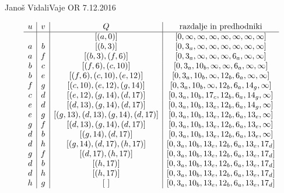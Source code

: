 \begin{naloga}{Janoš Vidali}{Vaje OR 7.12.2016}
\begin{odgovor}
\begin{tabela}
$$
\begin{array}{c|c|c|c}
u & v & Q & \text{razdalje in predhodniki} \\ \hline
  &   & [(a,0)]  & [0, \infty, \infty, \infty, \infty, \infty, \infty, \infty] \\
a & b & [(b, 3)]  & [0, 3_a, \infty, \infty, \infty, \infty, \infty, \infty] \\
a & f & [(b, 3), (f, 6)]  & [0, 3_a, \infty, \infty, \infty, 6_a, \infty, \infty] \\
b & c & [(f, 6), (c, 10)]  & [0, 3_a, 10_b, \infty, \infty, 6_a, \infty, \infty] \\
b & e & [(f, 6), (c, 10), (e, 12)]  & [0, 3_a, 10_b, \infty, 12_b, 6_a, \infty, \infty] \\
f & g & [(c, 10), (e, 12), (g, 14)]  & [0, 3_a, 10_b, \infty, 12_b, 6_a, 14_g, \infty] \\
c & d & [(e, 12), (g, 14), (d, 17)]  & [0, 3_a, 10_b, 17_c, 12_b, 6_a, 14_g, \infty] \\
e & d & [(d, 13), (g, 14), (d, 17)]  & [0, 3_a, 10_b, 13_e, 12_b, 6_a, 14_g, \infty] \\
e & g & [(g, 13), (d, 13), (g, 14), (d, 17)]  & [0, 3_a, 10_b, 13_e, 12_b, 6_a, 13_e, \infty] \\
g & f & [(d, 13), (g, 14), (d, 17)]  & [0, 3_a, 10_b, 13_e, 12_b, 6_a, 13_e, \infty] \\
d & b & [(g, 14), (d, 17)]  & [0, 3_a, 10_b, 13_e, 12_b, 6_a, 13_e, \infty] \\
d & h & [(g, 14), (d, 17), (h, 17)]  & [0, 3_a, 10_b, 13_e, 12_b, 6_a, 13_e, 17_d] \\
g & f & [(d, 17), (h, 17)]  & [0, 3_a, 10_b, 13_e, 12_b, 6_a, 13_e, 17_d] \\
d & b & [(h, 17)]  & [0, 3_a, 10_b, 13_e, 12_b, 6_a, 13_e, 17_d] \\
d & h & [(h, 17)]  & [0, 3_a, 10_b, 13_e, 12_b, 6_a, 13_e, 17_d] \\
h & g & [\ ]  & [0, 3_a, 10_b, 13_e, 12_b, 6_a, 13_e, 17_d]
\end{array}
$$
\end{tabela}

\begin{slika}
\end{slika}
\end{odgovor}
\end{naloga}
